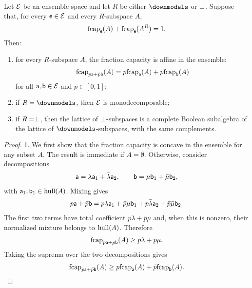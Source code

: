 \begin{mathSection}
	\begin{prop}\label{pm-es-complementaryFractionCapacity}
		Let $\Ens$ be an ensemble space and let $R$ be either $\separate$ or $\ortho$. Suppose that, for every $\ens \in \Ens$ and every $R$-subspace $A$,
		\begin{equation}
			\fcap_{\ens}(A) + \fcap_{\ens}(A^R) = 1.
		\end{equation}
		Then:
		\begin{enumerate}
			\item for every $R$-subspace $A$, the fraction capacity is affine in the ensemble:
			\begin{equation}
				\fcap_{p\ens[a]+\bar{p}\ens[b]}(A)
				= p\fcap_{\ens[a]}(A)+\bar{p}\fcap_{\ens[b]}(A)
			\end{equation}
			for all $\ens[a],\ens[b] \in \Ens$ and $p \in [0,1]$;
			\item if $R=\separate$, then $\Ens$ is monodecomposable;
			\item if $R=\ortho$, then the lattice of $\ortho$-subspaces is a complete Boolean subalgebra of the lattice of $\separate$-subspaces, with the same complements.
		\end{enumerate}
	\end{prop}
	
	\begin{proof}
		1. We first show that the fraction capacity is concave in the ensemble for any subset $A$. The result is immediate if $A=\emptyset$. Otherwise, consider decompositions
		\begin{equation}
			\ens[a] = \lambda\ens[a]_1+\bar{\lambda}\ens[a]_2,
			\qquad
			\ens[b] = \mu\ens[b]_1+\bar{\mu}\ens[b]_2,
		\end{equation}
		with $\ens[a]_1,\ens[b]_1 \in \hull(A)$. Mixing gives
		\begin{equation}
			p\ens[a]+\bar{p}\ens[b]
			= p\lambda\ens[a]_1+\bar{p}\mu\ens[b]_1
			+p\bar{\lambda}\ens[a]_2+\bar{p}\bar{\mu}\ens[b]_2.
		\end{equation}
		The first two terms have total coefficient $p\lambda+\bar{p}\mu$ and, when this is nonzero, their normalized mixture belongs to $\hull(A)$. Therefore
		\begin{equation}
			\fcap_{p\ens[a]+\bar{p}\ens[b]}(A)
			\geq p\lambda+\bar{p}\mu.
		\end{equation}
		Taking the suprema over the two decompositions gives
		\begin{equation}
			\fcap_{p\ens[a]+\bar{p}\ens[b]}(A)
			\geq p\fcap_{\ens[a]}(A)+\bar{p}\fcap_{\ens[b]}(A).
		\end{equation}
		

\end{proof}
\end{mathSection}
